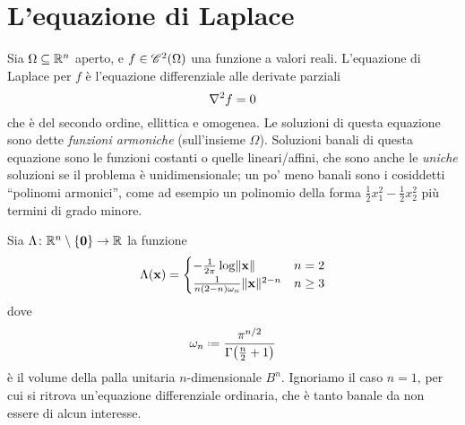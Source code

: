 \chapter{L'equazione di Laplace}
\newcommand{\sfl}{\Lambda} %
Sia $\Omega\subseteq\R^n$ aperto, e $f\in\cont[2]{\Omega}$ una funzione a valori reali.
L'equazione di Laplace per $f$ è l'equazione differenziale alle derivate parziali
\begin{equation}
    \lap f=0
    \label{eq:laplace}
\end{equation}
che è del secondo ordine, ellittica e omogenea.
Le soluzioni di questa equazione sono dette \emph{funzioni armoniche} (sull'insieme $\Omega$).
Soluzioni banali di questa equazione sono le funzioni costanti o quelle lineari/affini, che sono anche le \emph{uniche} soluzioni se il problema è unidimensionale; un po' meno banali sono i cosiddetti ``polinomi armonici'', come ad esempio un polinomio della forma $\frac12x_1^2-\frac12x_2^2$ più termini di grado minore.

Sia $\sfl\colon\R^n\setminus\{\vec 0\}\to\R$ la funzione
\begin{equation}
    \sfl(\vec x)=
    \begin{cases}
        -\frac1{2\pi}\log\norm{\vec x}      & n=2\\
        \frac1{n(2-n)\omega_n}\norm{\vec x}^{2-n}  & n\ge 3
    \end{cases}
    \label{eq:soluzione-fondamentale-laplace}
\end{equation}
dove
\begin{equation}
    \omega_n\defeq\frac{\pi^{n/2}}{\Gamma\bigl(\frac{n}2+1\bigr)}
    \label{eq:volume-palla-unitaria}
\end{equation}
è il volume della palla unitaria $n$-dimensionale $B^n$.
Ignoriamo il caso $n=1$, per cui si ritrova un'equazione differenziale ordinaria, che è tanto banale da non essere di alcun interesse.

